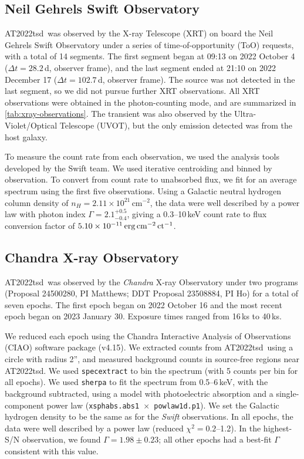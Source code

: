 \documentclass{nature_plusfigure}
\newcommand{\at}{AT2022tsd}
\begin{document}
\begin{methods}
\subsection{Neil Gehrels Swift Observatory}
\label{sec:swift}

\at\ was observed by the X-ray Telescope (XRT\cite{Burrows2005}) on board the Neil Gehrels Swift Observatory under a series of time-of-opportunity (ToO) requests, with a total of 14 segments. The first segment began at 09:13 on 2022 October 4 ($\Delta t=28.2\,$d, observer frame), and the last segment ended at 21:10 on 2022 December 17 ($\Delta t=102.7\,$d, observer frame). The source was not detected in the last segment, so we did not pursue further XRT observations.
All XRT observations were obtained in the photon-counting mode, and are summarized in \ref{tab:xray-observations}.
The transient was also observed by the Ultra-Violet/Optical Telescope (UVOT\cite{Roming2005}), but the only emission detected was from the host galaxy. 

To measure the count rate from each observation, we used the analysis tools developed by the Swift team\cite{Evans2007,Evans2009}.
We used iterative centroiding and binned by observation. 
To convert from count rate to unabsorbed flux, we fit for an average spectrum using the first five observations. Using a Galactic neutral hydrogen column density\cite{Willingale2013} of $n_H=2.11\times10^{21}\,$cm$^{-2}$, the data were well described by a power law with photon index $\Gamma=2.1^{+0.5}_{-0.4}$, 
giving a 0.3--10\,keV count rate to flux conversion factor of $5.10\times 10^{-11}\,\rm erg\,cm^{-2}\,ct^{-1}$.

\subsection{Chandra X-ray Observatory}
\label{sec:chandra}

\at\ was observed by the \emph{Chandra} X-ray Observatory under two programs (Proposal 24500280, PI Matthews; DDT Proposal 23508884, PI Ho) for a total of seven epochs. The first epoch began on 2022 October 16 and the most recent epoch began on 2023 January 30. Exposure times ranged from 16\,ks to 40\,ks.

We reduced each epoch using the Chandra Interactive Analysis of Observations (CIAO\cite{Fruscione2006}) software package (v4.15). We extracted counts from \at\ using a circle with radius 2'', and measured background counts in source-free regions near \at.
We used \texttt{specextract} to bin the spectrum (with 5 counts per bin for all epochs). We used \texttt{sherpa} to fit the spectrum from 0.5--6\,keV, with the background subtracted, using a model with photoelectric absorption and a single-component power law (\texttt{xsphabs.abs1 $\times$ powlaw1d.p1}). We set the Galactic hydrogen density to be the same as for the \emph{Swift} observations. In all epochs, the data were well described by a power law (reduced $\chi^2=0.2$--1.2). In the highest-S/N observation, we found $\Gamma=1.98\pm0.23$; all other epochs had a best-fit $\Gamma$ consistent with this value.


\end{methods}
\end{document}
